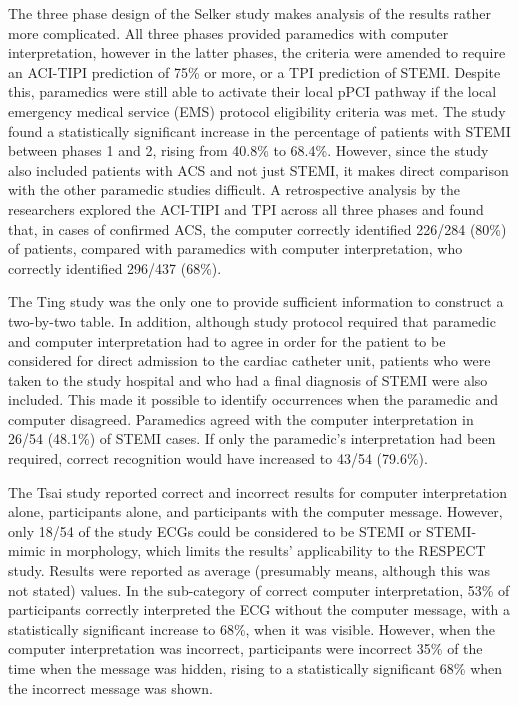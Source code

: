 The three phase design of the Selker study makes analysis of the results rather more complicated. All three phases provided paramedics with computer interpretation, however in the latter phases, the criteria were amended to require an ACI-TIPI prediction of 75\% or more, or a TPI prediction of STEMI. Despite this, paramedics were still able to activate their local pPCI pathway if the local emergency medical service (EMS) protocol eligibility criteria was met. The study found a statistically significant increase in the percentage of patients with STEMI between phases 1 and 2, rising from 40.8\% to 68.4\%. However, since the study also included patients with ACS and not just STEMI, it makes direct comparison with the other paramedic studies difficult. A retrospective analysis by the researchers explored the ACI-TIPI and TPI across all three phases and found that, in cases of confirmed ACS, the computer correctly identified 226\slash 284 (80\%) of patients, compared with paramedics with computer interpretation, who correctly identified 296\slash 437 (68\%).

The Ting study was the only one to provide sufficient information to construct a two-by-two table. In addition, although study protocol required that paramedic and computer interpretation had to agree in order for the patient to be considered for direct admission to the cardiac catheter unit, patients who were taken to the study hospital and who had a final diagnosis of STEMI were also included. This made it possible to identify occurrences when the paramedic and computer disagreed. Paramedics agreed with the computer interpretation in 26\slash 54 (48.1\%) of STEMI cases. If only the paramedic's interpretation had been required, correct recognition would have increased to 43\slash 54 (79.6\%).

The Tsai study reported correct and incorrect results for computer interpretation alone, participants alone, and participants with the computer message. However, only 18\slash 54 of the study ECGs could be considered to be STEMI or STEMI-mimic in morphology, which limits the results' applicability to the RESPECT study. Results were reported as average (presumably means, although this was not stated) values. In the sub-category of correct computer interpretation, 53\% of participants correctly interpreted the ECG without the computer message, with a statistically significant increase to 68\%, when it was visible. However, when the computer interpretation was incorrect, participants were incorrect 35\% of the time when the message was hidden, rising to a statistically significant 68\% when the incorrect message was shown.

